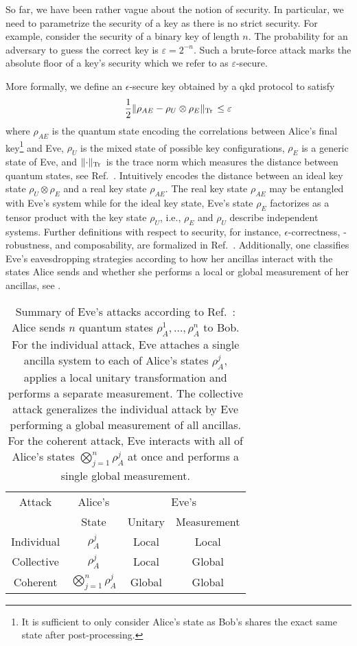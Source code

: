 So far, we have been rather vague about the notion of security.
In particular, we need to parametrize the security of a key as there is no strict security.
For example, consider the security of a binary key of length $n$.
The probability for an adversary to guess the correct key is $\varepsilon=2^{-n}$.
Such a brute-force attack marks the absolute floor of a key's security which we refer to as $\varepsilon$-secure.

More formally, we define an $\epsilon$-secure key obtained by a \gls{qkd} protocol to satisfy~\cite[p.~10]{Scarani2009}
\begin{equation}
	\frac{1}{2}
	\lVert\rho_{AE}-\rho_U\otimes\rho_E\rVert_{\operatorname{Tr}{}}
	\leq
	\varepsilon
	\label{eq:qkd_security}
\end{equation}
where $\rho_{AE}$ is the quantum state encoding the correlations between Alice's final key\footnote{It is sufficient to only consider Alice's state as Bob's shares the exact same state after post-processing.} and Eve, $\rho_U$ is the mixed state of possible key configurations, $\rho_E$ is a generic state of Eve, and $\lVert\cdot\rVert_{\operatorname{Tr}{}}$ is the trace norm which measures the distance between quantum states, see Ref.~\cite[p.~49]{Wolf2021}.
Intuitively  encodes the distance between an ideal key state $\rho_U\otimes\rho_E$ and a real key state $\rho_{AE}$.
The real key state $\rho_{AE}$ may be entangled with Eve's system while for the ideal key state, Eve's state $\rho_E$ factorizes as a tensor product with the key state $\rho_U$, i.e., $\rho_E$ and $\rho_U$ describe independent systems.
Further definitions with respect to security, for instance, $\epsilon$-correctness, -robustness, and composability, are formalized in Ref.~\cite[p.~119]{Wolf2021}.
Additionally, one classifies Eve's eavesdropping strategies according to how her ancillas interact with the states Alice sends and whether she performs a local or global measurement of her ancillas, see .
\begin{table}[htb]
	\centering
	\begin{tabular}{cccc}
		\toprule
			Attack & Alice's & \multicolumn{2}{c}{Eve's} \\
			& State & Unitary & Measurement \\
		\midrule
			Individual & $\rho_A^j$ & Local & Local \\
			Collective & $\rho_A^j$ & Local & Global \\
			Coherent & $\bigotimes_{j=1}^n\rho_A^j$ & Global & Global \\
		\bottomrule
	\end{tabular}
	\caption{Summary of Eve's attacks according to Ref.~\cite[p.~128]{Wolf2021}: Alice sends $n$ quantum states $\rho_A^1,\dots,\rho_A^n$ to Bob. For the individual attack, Eve attaches a single ancilla system to each of Alice's states $\rho_A^j$, applies a local unitary transformation and performs a separate measurement. The collective attack generalizes the individual attack by Eve performing a global measurement of all ancillas. For the coherent attack, Eve interacts with all of Alice's states $\bigotimes_{j=1}^n\rho_A^j$ at once and performs a single global measurement.}\label{tab:eavesdropping_strategies}
\end{table}
